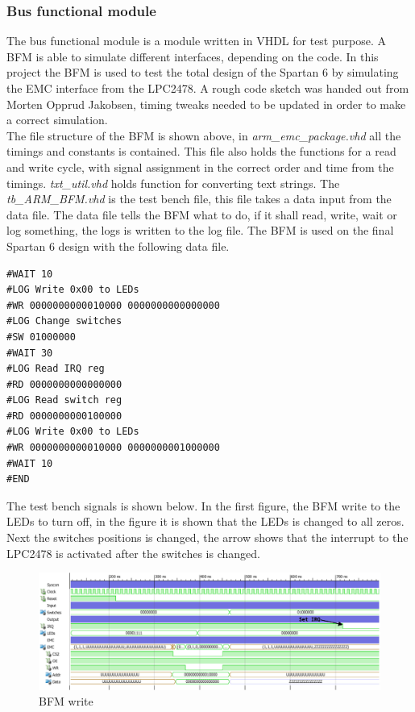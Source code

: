 \subsubsection{Bus functional module}
The bus functional module is a module written in VHDL for test purpose. A BFM is able to simulate different interfaces, depending on the code. In this project the BFM is used to test the total design of the Spartan 6 by simulating the EMC interface from the LPC2478. A rough code sketch was handed out from Morten Opprud Jakobsen, timing tweaks needed to be updated in order to make a correct simulation.\\
The file structure of the BFM is shown above, in \textit{arm\_emc\_package.vhd} all the timings and constants is contained. This file also holds the functions for a read and write cycle, with signal assignment in the correct order and time from the timings. \textit{txt\_util.vhd} holds function for converting text strings. The \textit{tb\_ARM\_BFM.vhd} is the test bench file, this file takes a data input from the data file. The data file tells the BFM what to do, if it shall read, write, wait or log something, the logs is written to the log file. The BFM is used on the final Spartan 6 design with the following data file.
\begin{lstlisting}[caption=BFM data file]
#WAIT 10
#LOG Write 0x00 to LEDs
#WR 0000000000010000 0000000000000000
#LOG Change switches
#SW 01000000
#WAIT 30
#LOG Read IRQ reg
#RD 0000000000000000
#LOG Read switch reg
#RD 0000000000100000
#LOG Write 0x00 to LEDs
#WR 0000000000010000 0000000001000000
#WAIT 10
#END
\end{lstlisting}
The test bench signals is shown below. In the first figure, the BFM write to the LEDs to turn off, in the figure it is shown that the LEDs is changed to all zeros. Next the switches positions is changed, the arrow shows that the interrupt to the LPC2478 is activated after the switches is changed.
\begin{figure}[H]
	\begin{centering}
		\includegraphics[width=1.0\textwidth]{images/tb7_BFM_write.eps}
		\caption{BFM write}
	\end{centering}
\end{figure}
